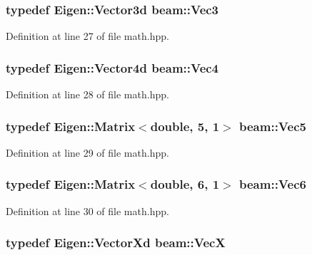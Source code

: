 \subsubsection[{\texorpdfstring{Vec3}{Vec3}}]{\setlength{\rightskip}{0pt plus 5cm}typedef Eigen\+::\+Vector3d {\bf beam\+::\+Vec3}}\hypertarget{group__utils_ga7aca82b90a74cb643417801e830cd43f}{}\label{group__utils_ga7aca82b90a74cb643417801e830cd43f}


Definition at line 27 of file math.\+hpp.

\subsubsection[{\texorpdfstring{Vec4}{Vec4}}]{\setlength{\rightskip}{0pt plus 5cm}typedef Eigen\+::\+Vector4d {\bf beam\+::\+Vec4}}\hypertarget{group__utils_gae8c630e8f7e9cdbc1a7dcc3073a99d5c}{}\label{group__utils_gae8c630e8f7e9cdbc1a7dcc3073a99d5c}


Definition at line 28 of file math.\+hpp.

\subsubsection[{\texorpdfstring{Vec5}{Vec5}}]{\setlength{\rightskip}{0pt plus 5cm}typedef Eigen\+::\+Matrix$<$double, 5, 1$>$ {\bf beam\+::\+Vec5}}\hypertarget{group__utils_gabd17e53e0e9320ff4dcbad3b0e591928}{}\label{group__utils_gabd17e53e0e9320ff4dcbad3b0e591928}


Definition at line 29 of file math.\+hpp.

\subsubsection[{\texorpdfstring{Vec6}{Vec6}}]{\setlength{\rightskip}{0pt plus 5cm}typedef Eigen\+::\+Matrix$<$double, 6, 1$>$ {\bf beam\+::\+Vec6}}\hypertarget{group__utils_ga9f18e27181a175dfd15dc192a7d417d1}{}\label{group__utils_ga9f18e27181a175dfd15dc192a7d417d1}


Definition at line 30 of file math.\+hpp.

\subsubsection[{\texorpdfstring{VecX}{VecX}}]{\setlength{\rightskip}{0pt plus 5cm}typedef Eigen\+::\+Vector\+Xd {\bf beam\+::\+VecX}}\hypertarget{group__utils_gae5ba967e4b0d4b421ca30ef46f896145}{}\label{group__utils_gae5ba967e4b0d4b421ca30ef46f896145}


